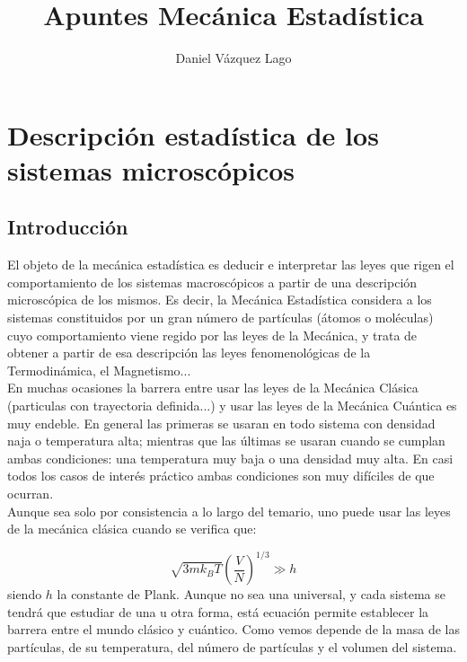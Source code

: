 \documentclass[12pt,a4paper]{article}
\title{Apuntes Mecánica Estadística}
\author{Daniel Vázquez Lago}
\numberwithin{equation}{section}
\numberwithin{figure}{section}
\newcommand{\parentesis}[1]{\left( #1  \right)}
\theoremstyle{definition}
\begin{document}
\maketitle

\newpage

\tableofcontents

\newpage


\section{Descripción estadística de los sistemas microscópicos}

\subsection{Introducción}

El objeto de la mecánica estadística es deducir e interpretar las leyes que rigen el comportamiento de los sistemas macroscópicos a partir de una descripción microscópica de los mismos. Es decir, la Mecánica Estadística considera a los sistemas constituidos por un gran número de partículas (átomos o moléculas) cuyo comportamiento viene regido por las leyes de la Mecánica, y trata  de obtener a partir de esa descripción las leyes fenomenológicas de la Termodinámica, el Magnetismo... \\

En muchas ocasiones la barrera entre usar las leyes de la Mecánica Clásica (particulas con trayectoria definida...) y usar las leyes de la Mecánica Cuántica es muy endeble. En general las primeras se usaran en todo sistema con densidad naja o temperatura alta; mientras que las últimas se usaran cuando se cumplan ambas condiciones: una temperatura muy baja o una densidad muy alta. En casi todos los casos de interés práctico ambas condiciones son muy difíciles de que ocurran. \\

Aunque sea solo por consistencia a lo largo del temario, uno puede usar las leyes de la mecánica clásica cuando se verifica que:

\begin{equation}
\sqrt{3 m k_B T} \parentesis{\dfrac{V}{N}}^{1/3} \gg h
\end{equation}
siendo $h$ la constante de Plank. Aunque no sea una universal, y cada sistema se tendrá que estudiar de una u otra forma, está ecuación permite establecer la barrera entre el mundo clásico y cuántico. Como vemos depende de la masa de las partículas, de su temperatura, del número de partículas y el volumen del sistema. \\
\end{document}
